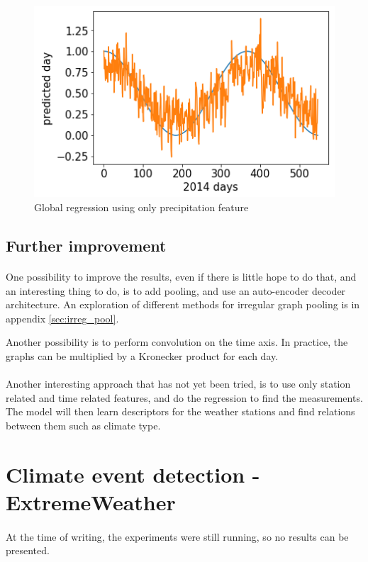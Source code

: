 \documentclass[11pt]{report}
\begin{document}
\begin{figure}[!ht]
    \centering
    \includegraphics[width=0.5\linewidth]{figures/global_cos_reg_results.png}
    \caption{Global regression using only precipitation feature}
    \label{fig:glob_prec}
\end{figure}

\subsection{Further improvement}
\paragraph*{}
One possibility to improve the results, even if there is little hope to do that, and an interesting thing to do, is to add pooling, and use an auto-encoder decoder architecture. An exploration of different methods for irregular graph pooling is in appendix \ref{sec:irreg_pool}. 

Another possibility is to perform convolution on the time axis. In practice, the graphs can be multiplied by a Kronecker product for each day.

\paragraph*{}
Another interesting approach that has not yet been tried, is to use only station related and time related features, and do the regression to find the measurements. The model will then learn descriptors for the weather stations and find relations between them such as climate type.



\section{Climate event detection - ExtremeWeather}\label{task:ExtremeWeather}
\paragraph*{}
At the time of writing, the experiments were still running, so no results can be presented.
\end{document}
